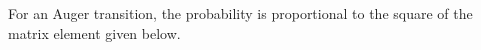 \SolutionHeading For an Auger transition, the probability is proportional to the square of the matrix element given below.
